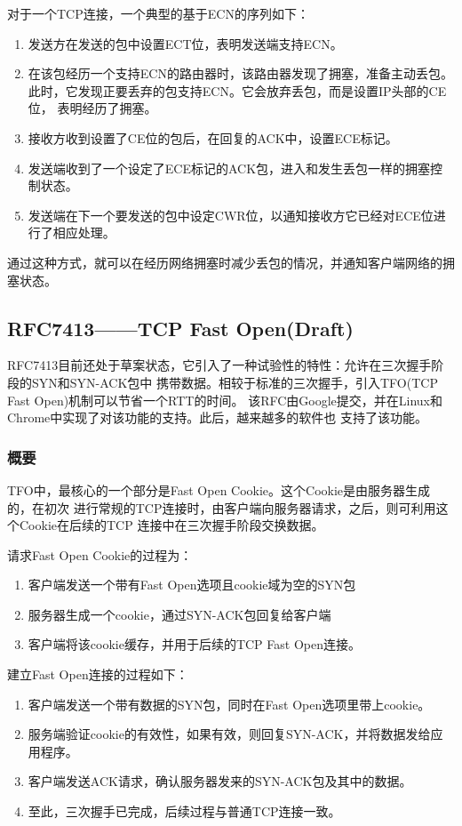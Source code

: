 对于一个TCP连接，一个典型的基于ECN的序列如下：
\begin{enumerate}
  \item 发送方在发送的包中设置ECT位，表明发送端支持ECN。
  \item 在该包经历一个支持ECN的路由器时，该路由器发现了拥塞，准备主动丢包。
    此时，它发现正要丢弃的包支持ECN。它会放弃丢包，而是设置IP头部的CE位，
    表明经历了拥塞。
  \item 接收方收到设置了CE位的包后，在回复的ACK中，设置ECE标记。
  \item 发送端收到了一个设定了ECE标记的ACK包，进入和发生丢包一样的拥塞控制状态。
  \item 发送端在下一个要发送的包中设定CWR位，以通知接收方它已经对ECE位进行了相应处理。
\end{enumerate}

通过这种方式，就可以在经历网络拥塞时减少丢包的情况，并通知客户端网络的拥塞状态。

\subsection{RFC7413——TCP Fast Open(Draft)}
\label{subsec:rfc7413}

RFC7413目前还处于草案状态，它引入了一种试验性的特性：允许在三次握手阶段的SYN和SYN-ACK包中
携带数据。相较于标准的三次握手，引入TFO(TCP Fast Open)机制可以节省一个RTT的时间。
该RFC由Google提交，并在Linux和Chrome中实现了对该功能的支持。此后，越来越多的软件也
支持了该功能。

\subsubsection{概要}
\label{subsubsec:rfc7413-overview}
TFO中，最核心的一个部分是Fast Open Cookie。这个Cookie是由服务器生成的，在初次
进行常规的TCP连接时，由客户端向服务器请求，之后，则可利用这个Cookie在后续的TCP
连接中在三次握手阶段交换数据。

请求Fast Open Cookie的过程为：
\begin{enumerate}
  \item 客户端发送一个带有Fast Open选项且cookie域为空的SYN包
  \item 服务器生成一个cookie，通过SYN-ACK包回复给客户端
  \item 客户端将该cookie缓存，并用于后续的TCP Fast Open连接。
\end{enumerate}

建立Fast Open连接的过程如下：
\begin{enumerate}
  \item 客户端发送一个带有数据的SYN包，同时在Fast Open选项里带上cookie。
  \item 服务端验证cookie的有效性，如果有效，则回复SYN-ACK，并将数据发给应用程序。
  \item 客户端发送ACK请求，确认服务器发来的SYN-ACK包及其中的数据。
  \item 至此，三次握手已完成，后续过程与普通TCP连接一致。
\end{enumerate}

